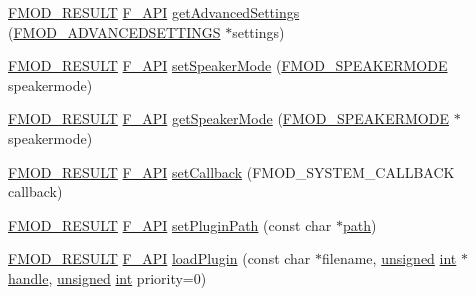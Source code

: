 \begin{DoxyCompactItemize}
\item 
\hyperlink{fmod_8h_ae6ddadf8cb315e93ae7e6456b19db276}{F\-M\-O\-D\-\_\-\-R\-E\-S\-U\-L\-T} \hyperlink{fmod_8h_ace803d13e798b0cdde4384f9f323b901}{F\-\_\-\-A\-P\-I} \hyperlink{class_f_m_o_d_1_1_system_a9c111315da6297cb6889aedfd46c3daa}{get\-Advanced\-Settings} (\hyperlink{struct_f_m_o_d___a_d_v_a_n_c_e_d_s_e_t_t_i_n_g_s}{F\-M\-O\-D\-\_\-\-A\-D\-V\-A\-N\-C\-E\-D\-S\-E\-T\-T\-I\-N\-G\-S} $\ast$settings)
\item 
\hyperlink{fmod_8h_ae6ddadf8cb315e93ae7e6456b19db276}{F\-M\-O\-D\-\_\-\-R\-E\-S\-U\-L\-T} \hyperlink{fmod_8h_ace803d13e798b0cdde4384f9f323b901}{F\-\_\-\-A\-P\-I} \hyperlink{class_f_m_o_d_1_1_system_a08636005f5f2a6a435470a56a3bfb6a8}{set\-Speaker\-Mode} (\hyperlink{fmod_8h_ae25dfd3a3dd6545c935386ef591f1368}{F\-M\-O\-D\-\_\-\-S\-P\-E\-A\-K\-E\-R\-M\-O\-D\-E} speakermode)
\item 
\hyperlink{fmod_8h_ae6ddadf8cb315e93ae7e6456b19db276}{F\-M\-O\-D\-\_\-\-R\-E\-S\-U\-L\-T} \hyperlink{fmod_8h_ace803d13e798b0cdde4384f9f323b901}{F\-\_\-\-A\-P\-I} \hyperlink{class_f_m_o_d_1_1_system_a4ed6cc41bbb35016a0093054c17c0a4a}{get\-Speaker\-Mode} (\hyperlink{fmod_8h_ae25dfd3a3dd6545c935386ef591f1368}{F\-M\-O\-D\-\_\-\-S\-P\-E\-A\-K\-E\-R\-M\-O\-D\-E} $\ast$speakermode)
\item 
\hyperlink{fmod_8h_ae6ddadf8cb315e93ae7e6456b19db276}{F\-M\-O\-D\-\_\-\-R\-E\-S\-U\-L\-T} \hyperlink{fmod_8h_ace803d13e798b0cdde4384f9f323b901}{F\-\_\-\-A\-P\-I} \hyperlink{class_f_m_o_d_1_1_system_a479bb915a2e04c9374f599f007b6cc0a}{set\-Callback} (F\-M\-O\-D\-\_\-\-S\-Y\-S\-T\-E\-M\-\_\-\-C\-A\-L\-L\-B\-A\-C\-K callback)
\item 
\hyperlink{fmod_8h_ae6ddadf8cb315e93ae7e6456b19db276}{F\-M\-O\-D\-\_\-\-R\-E\-S\-U\-L\-T} \hyperlink{fmod_8h_ace803d13e798b0cdde4384f9f323b901}{F\-\_\-\-A\-P\-I} \hyperlink{class_f_m_o_d_1_1_system_ae1a00669920caf97abb5228d2053a28a}{set\-Plugin\-Path} (const char $\ast$\hyperlink{glew_8h_ae517c090b864e6b2846c380c4125f4c5}{path})
\item 
\hyperlink{fmod_8h_ae6ddadf8cb315e93ae7e6456b19db276}{F\-M\-O\-D\-\_\-\-R\-E\-S\-U\-L\-T} \hyperlink{fmod_8h_ace803d13e798b0cdde4384f9f323b901}{F\-\_\-\-A\-P\-I} \hyperlink{class_f_m_o_d_1_1_system_a046e94ca835e30f60564dbf44cfa111f}{load\-Plugin} (const char $\ast$filename, \hyperlink{_free_image_8h_a425076c7067a1b5166e2cc530e914814}{unsigned} \hyperlink{wglew_8h_a500a82aecba06f4550f6849b8099ca21}{int} $\ast$\hyperlink{fmod_8h_a168db7c720117b4efc1ec55c5513f7f6}{handle}, \hyperlink{_free_image_8h_a425076c7067a1b5166e2cc530e914814}{unsigned} \hyperlink{wglew_8h_a500a82aecba06f4550f6849b8099ca21}{int} priority=0)

\end{DoxyCompactItemize}
